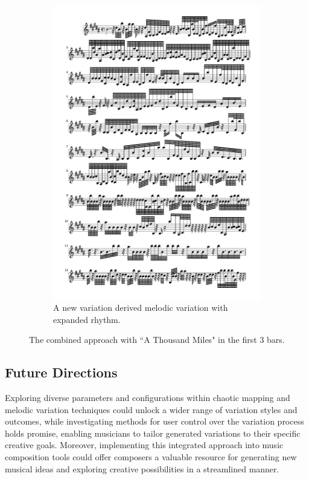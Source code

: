 \documentclass[11pt]{article}
\theoremstyle{definition}
\begin{document}
\begin{figure}
\begin{subfigure}{\textwidth}
\includegraphics[trim=1cm 23.75cm 1cm 0.5cm, clip, scale=0.8]{New_ATM.pdf}
\caption{A new variation derived melodic variation with expanded rhythm.} 
\label{fig:NATM}
\end{subfigure}
\caption{The combined approach with ``A Thousand Miles" in the first 3 bars.} 
\label{fig: exam2}
\end{figure}

\subsection{Future Directions}

Exploring diverse parameters and configurations within chaotic mapping and melodic variation techniques could unlock a wider range of variation styles and outcomes, while investigating methods for user control over the variation process holds promise, enabling musicians to tailor generated variations to their specific creative goals. 
Moreover, implementing this integrated approach into music composition tools could offer composers a valuable resource for generating new musical ideas and exploring creative possibilities in a streamlined manner.
\end{document}
